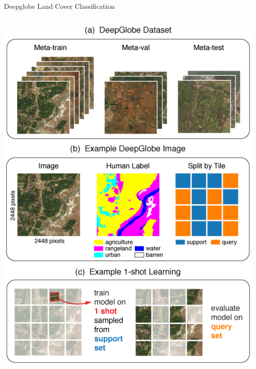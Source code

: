 \documentclass[11pt]{beamer}
\begin{document}
	
	
	\begin{frame}{Deepglobe Land Cover Classification}
		\begin{columns}
			\includegraphics[width=\textwidth]{deepglobe/deepglobe_dataset}
			
\end{columns}
\end{frame}
\end{document}
